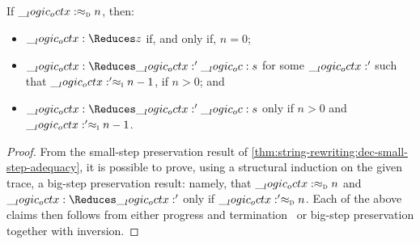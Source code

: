 \begin{corollary}
  If $\__logic_octx: \approx\sb{\text{\normalfont\scshape d}} n$, then:
  \begin{itemize}[nosep]
  \item $\octx \Reduces z$ if, and only if, $n = 0$;
  \item $\octx \Reduces \octx' \oc s$ for some $\__logic_octx:'$ such that $\__logic_octx:' \approx\sb{\text{\normalfont\scshape i}} n-1$, if $n > 0$; and
  \item $\octx \Reduces \octx' \oc s$ only if $n > 0$ and $\__logic_octx:' \approx\sb{\text{\normalfont\scshape i}} n-1$.
  \end{itemize}
\end{corollary}
\begin{proof}
  From the small-step preservation result of \cref{thm:string-rewriting:dec-small-step-adequacy}, it is possible to prove, using a structural induction on the given trace, a big-step preservation result: namely, that $\__logic_octx: \approx\sb{\text{\normalfont\scshape d}} n$ and $\octx \Reduces \octx'$ only if $\__logic_octx:' \approx\sb{\text{\normalfont\scshape d}} n$.
  Each of the above claims then follows from either progress and termination~ or big-step preservation together with inversion.
\end{proof}

% 


